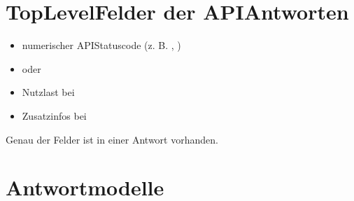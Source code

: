 \documentclass[letterpaper,10pt,english]{sphinxmanual}
\begin{document}
\section{Top\sphinxhyphen{}Level\sphinxhyphen{}Felder der API\sphinxhyphen{}Antworten}
\label{\detokenize{agv_overview:top-level-felder-der-api-antworten}}\begin{itemize}
\item {} 
\sphinxAtStartPar
{}  \textendash{} numerischer API\sphinxhyphen{}Statuscode (z. B. , )

\item {} 
\sphinxAtStartPar
{}  \textendash{}  oder 

\item {} 
\sphinxAtStartPar
{}  \textendash{} Nutzlast bei 

\item {} 
\sphinxAtStartPar
{}  \textendash{} Zusatzinfos bei 

\end{itemize}

\sphinxAtStartPar
Genau  der Felder    ist in einer Antwort vorhanden.


\section{Antwortmodelle}
\label{\detokenize{agv_overview:antwortmodelle}}
\sphinxAtStartPar
{}

\begin{sphinxVerbatim}[commandchars=\\\{\}]
\end{sphinxVerbatim}
\end{document}
